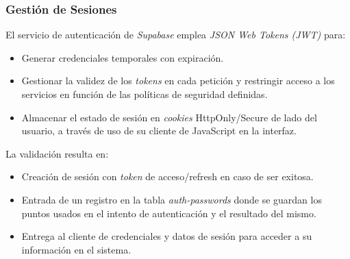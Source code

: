 \subsubsection{Gestión de Sesiones}
El servicio de autenticación de \textit{Supabase}  emplea \textit{JSON Web Tokens (JWT)} para:

\begin{itemize}
	\item Generar credenciales temporales con expiración.
	\item Gestionar la validez de los \textit{tokens} en cada petici\'on y restringir acceso a los servicios en funci\'on de las pol\'iticas de seguridad definidas.
	\item Almacenar el estado de sesión en \textit{cookies} HttpOnly/Secure de lado del usuario, a trav\'es de uso de su cliente de JavaScript en la interfaz.
\end{itemize}

La validación resulta en:
\begin{itemize}
	\item Creación de sesión con \textit{token} de acceso/refresh en caso de ser exitosa.
	\item Entrada de un registro en la tabla \textit{auth-passwords} donde se guardan los puntos usados en el intento de autenticaci\'on y el resultado del mismo.
	\item Entrega al cliente de credenciales y datos de sesi\'on para acceder a su informaci\'on en el sistema.
\end{itemize}

